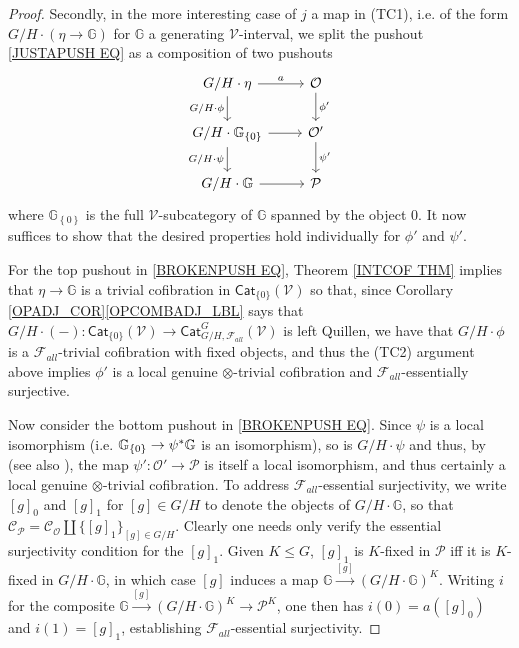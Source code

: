 \documentclass[a4paper,10pt
 ,final
]{article}%
\numberwithin{equation}{section}
\numberwithin{figure}{section}
\theoremstyle{definition} %
\newcommand{\set}[1]{\left\{#1\right\}}%
\newcommand{\F}{\ensuremath{\mathcal F}}
\newcommand{\V}{\ensuremath{\mathcal V}}
\renewcommand{\O}{\ensuremath{\mathcal O}}
\renewcommand{\P}{\ensuremath{\mathcal P}}
\newcommand{\C}{\ensuremath{\mathcal C}}
\newcommand{\1}{\ensuremath{\mathbbm 1}}%
\begin{document}
\begin{proof}
     
	Secondly, in the more interesting case of $j$ a map in (TC1), 
	i.e. of the form $G/H \cdot (\eta \to \mathbb{G})$ for $\mathbb{G}$ a generating $\V$-interval,
	we split the pushout \eqref{JUSTAPUSH EQ} as a composition of two pushouts 
\begin{equation}\label{BROKENPUSH EQ}
\begin{tikzcd}
	G/H \cdot \eta \arrow[r, "a"] \arrow[d, "G/H \cdot \phi"']
&
	\O \arrow[d,"\phi'"]
\\
	G/H \cdot \mathbb{G}_{\set{0}} \arrow[r] \arrow[d, "G/H \cdot \psi"']
&
	\O' \arrow[d,"\psi'"]
\\
	G/H \cdot \mathbb{G} \arrow[r]
&
	\P
\end{tikzcd}
\end{equation}
	where $\mathbb{G}_{\set{0}}$ is the full $\V$-subcategory of $\mathbb{G}$ spanned by the object $0$.
	It now suffices to show that the desired properties hold individually for $\phi'$ and $\psi'$.


	For the top pushout in \eqref{BROKENPUSH EQ}, Theorem \ref{INTCOF THM} implies that $\eta \to \mathbb{G}$
	is a trivial cofibration in $\mathsf{Cat}_{\{0\}}(\V)$
	so that, since Corollary \ref{OPADJ_COR}\ref{OPCOMBADJ_LBL} %
      says that $G/H \cdot (-) \colon \mathsf{Cat}_{\{0\}}(\V) \to \mathsf{Cat}^G_{G/H,\F_{all}}(\V)$ is left Quillen,
      we have that $G/H \cdot \phi$ is a $\F_{all}$-trivial cofibration with fixed objects,
      and thus the (TC2) argument above implies $\phi'$ is
      a local genuine $\otimes$-trivial cofibration and
      $\F_{all}$-essentially surjective.
      
	Now consider the bottom pushout in \eqref{BROKENPUSH EQ}.
	Since $\psi$ is a local isomorphism (i.e. $\mathbb{G}_{\{0\}} \to \psi^{\**}\mathbb{G}$ is an isomorphism),
	so is $G/H \cdot \psi$ and thus, by 
	\cite[Cor. \ref{OC-LOCALISO_COR}]{BP_FCOP}
	(see also \cite[Prop. B.22]{Cav}),
	the map $\psi' \colon \O' \to \mathcal{P}$
	is itself a local isomorphism, and thus certainly a local genuine $\otimes$-trivial cofibration.
% 
	To address $\F_{all}$-essential surjectivity, 
	we write $[g]_0$ and $[g]_1$ for $[g] \in G/H$
	to denote the objects of $G/H \cdot \mathbb{G}$,
	so that $\C_{\P} = \C_{\O} \amalg \{[g]_1\}_{[g] \in G/H}$.
	Clearly one needs only verify the essential surjectivity condition for the $[g]_1$.
	Given $K \leq G$,
	$[g]_1$ is $K$-fixed in $\P$ iff it is $K$-fixed in $G/H \cdot \mathbb{G}$,
	in which case $[g]$ induces a map
	$\mathbb{G} \xrightarrow{[g]} \left(G/H \cdot \mathbb{G}\right)^K$.
	Writing $i$ for the composite 
	$\mathbb{G} \xrightarrow{[g]} \left(G/H \cdot \mathbb{G}\right)^K \to \P^K$,
	one then has $i(0) = a([g]_0)$ and $i(1)=[g]_1$,
	establishing $\F_{all}$-essential surjectivity.
\end{proof}
\end{document}
